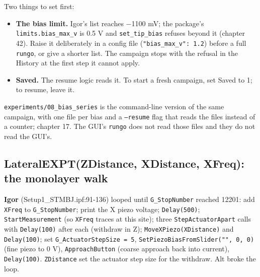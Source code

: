 Two things to set first:

\begin{itemize}[leftmargin=*]
\item \textbf{The bias limit.} Igor's list reaches −1100 mV; the package's \texttt{limits.\discretionary{}{}{}bias\_\discretionary{}{}{}max\_\discretionary{}{}{}v} is 0.5 V and \texttt{set\_\discretionary{}{}{}tip\_\discretionary{}{}{}bias} refuses beyond it (chapter 42). Raise it deliberately in a config file (\texttt{"bias\_\discretionary{}{}{}max\_\discretionary{}{}{}v": 1.\discretionary{}{}{}2}) before a full \texttt{rungo}, or give a shorter list. The campaign stops with the refusal in the History at the first step it cannot apply.
\item \textbf{Saved.} The resume logic reads it. To start a fresh campaign, set Saved to 1; to resume, leave it.
\end{itemize}

\texttt{experiments/\discretionary{}{}{}08\_\discretionary{}{}{}bias\_\discretionary{}{}{}series} is the command-line version of the same campaign, with one file per bias and a \texttt{--resume} flag that reads the files instead of a counter; chapter 17. The GUI's \texttt{rungo} does not read those files and they do not read the GUI's.

\subsection{LateralEXPT(ZDistance, XDistance, XFreq): the monolayer walk}

\textbf{Igor} (Setup1\_STMBJ.ipf:91-136) looped until \texttt{G\_\discretionary{}{}{}Stop\discretionary{}{}{}Number} reached 12201: add \texttt{XFreq} to \texttt{G\_\discretionary{}{}{}Stop\discretionary{}{}{}Number}; print the X piezo voltage; \texttt{Delay(500)}; \texttt{Start\discretionary{}{}{}Measurement} (so \texttt{XFreq} traces at this site); three \texttt{Step\discretionary{}{}{}Actuator\discretionary{}{}{}Apart} calls with \texttt{Delay(100)} after each (withdraw in Z); \texttt{Move\discretionary{}{}{}XPiezo(XDistance)} and \texttt{Delay(100)}; set \texttt{G\_\discretionary{}{}{}Actuator\discretionary{}{}{}Step\discretionary{}{}{}Size = 5}, \texttt{Set\discretionary{}{}{}Piezo\discretionary{}{}{}Bias\discretionary{}{}{}From\discretionary{}{}{}Slider("",\discretionary{}{}{} 0,\discretionary{}{}{} 0)} (fine piezo to 0 V), \texttt{Approach\discretionary{}{}{}Button} (coarse approach back into current), \texttt{Delay(100)}. \texttt{ZDistance} set the actuator step size for the withdraw. Alt broke the loop.

